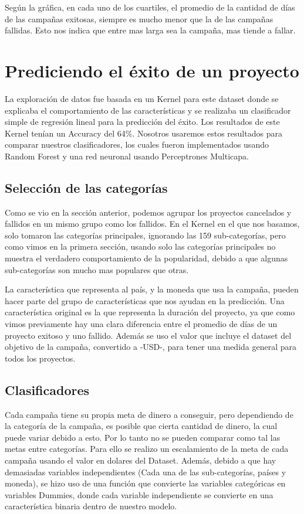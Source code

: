 \documentclass[journal]{IEEEtran}
\begin{document}
Según la gráfica, en cada uno de los cuartiles, el promedio de la cantidad de días de las campañas exitosas, siempre es mucho menor que la de las campañas fallidas. Esto nos indica que entre mas larga sea la campaña, mas tiende a fallar.

\section{Prediciendo el éxito de un proyecto}
La exploración de datos fue basada en un Kernel para este dataset donde se explicaba el comportamiento de las características y se realizaba un clasificador simple de regresión lineal para la predicción del éxito. Los resultados de este Kernel tenían un Accuracy del 64\%. Nosotros usaremos estos resultados para comparar nuestros clasificadores, los cuales fueron implementados usando Random Forest y una red neuronal usando Perceptrones Multicapa.

\subsection{Selección de las categorías}
Como se vio en la sección anterior, podemos agrupar los proyectos cancelados y fallidos en un mismo grupo como los fallidos. En el Kernel en el que nos basamos, solo tomaron las categorías principales, ignorando las 159 sub-categorías, pero como vimos en la primera sección, usando solo las categorías principales no muestra el verdadero comportamiento de la popularidad, debido a que algunas sub-categorías son mucho mas populares que otras.

La característica que representa al país, y la moneda que usa la campaña, pueden hacer parte del grupo de características que nos ayudan en la predicción. Una característica original es la que representa la duración del proyecto, ya que como vimos previamente hay una clara diferencia entre el promedio de días de un proyecto exitoso y uno fallido. Además se uso el valor que incluye el dataset del objetivo de la campaña, convertido a -USD-, para tener una medida general para todos los proyectos.

\subsection{Clasificadores}
Cada campaña tiene su propia meta de dinero a conseguir, pero dependiendo de la categoría de la campaña, es posible que cierta cantidad de dinero, la cual puede variar debido a esto. Por lo tanto no se pueden comparar como tal las metas entre categorías. Para ello se realizo un escalamiento de la meta de cada campaña usando el valor en dolares del Dataset. Además, debido a que hay demasiadas variables independientes (Cada una de las sub-categorías, países y moneda), se hizo uso de una función que convierte las variables categóricas en variables Dummies, donde cada variable independiente se convierte en una característica binaria dentro de nuestro modelo.
\end{document}
